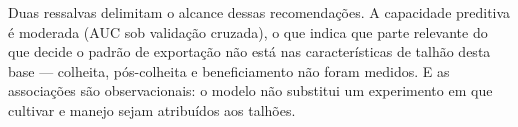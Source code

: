 Duas ressalvas delimitam o alcance dessas recomendações. A capacidade preditiva é
moderada (AUC \cAUCcv{} sob validação cruzada), o que indica que parte relevante do que
decide o padrão de exportação não está nas características de talhão desta base ---
colheita, pós-colheita e beneficiamento não foram medidos. E as associações são
observacionais: o modelo não substitui um experimento em que cultivar e manejo sejam
atribuídos aos talhões.
